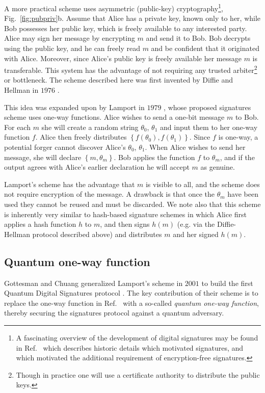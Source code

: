 A more practical scheme uses asymmetric (public-key) cryptography\footnote{A fascinating overview of the development of digital signatures may be found in Ref.~\cite{Simmons1988} which describes historic details which motivated signatures, and which motivated the additional requirement of encryption-free signatures.}, Fig.~\ref{fig:pubpriv}b. Assume that Alice has a private key, known only to her, while Bob possesses her public key, which is freely available to any interested party. Alice may sign her message by encrypting $m$ and send it to Bob. Bob decrypts using the public key, and he can freely read $m$ and be confident that it originated with Alice. Moreover, since Alice's public key is freely available her message $m$ is transferable. This system has the advantage of not requiring any trusted arbiter\footnote{Though in practice one will use a certificate authority to distribute the public keys.} or bottleneck. The scheme described here was first invented by Diffie and Hellman in $1976$ \cite{Diffie1976}.

This idea was expanded upon by Lamport in $1979$ \cite{Lamport1979}, whose proposed signatures scheme uses one-way functions. Alice wishes to send a one-bit message $m$ to Bob. For each $m$ she will create a random string $\theta_0$, $\theta_1$ and input them to her one-way function $f$. Alice then freely distributes $\left\{f\left(\theta_0\right), f\left(\theta_1\right)\right\}$. Since $f$ is one-way, a potential forger cannot discover Alice's $\theta_0$, $\theta_1$. When Alice wishes to send her message, she will declare $\left\{m, \theta_m\right\}$. Bob applies the function $f$ to $\theta_m$, and if the output agrees with Alice's earlier declaration he will accept $m$ as genuine. 

Lamport's scheme has the advantage that $m$ is visible to all, and the scheme does not require encryption of the message. A drawback is that once the $\theta_m$ have been used they cannot be reused and must be discarded. We note also that this scheme is inherently very similar to hash-based signature schemes in which Alice first applies a hash function $h$ \cite{Schneier1996} to $m$, and then signs $h\left(m\right)$ (e.g. via the Diffie-Hellman protocol described above) and distributes $m$ and her signed $h\left(m\right)$.



\subsection{Quantum one-way function}
Gottesman and Chuang generalized Lamport's scheme in $2001$ to build the first Quantum Digital Signatures protocol \cite{Gottesman2001}. The key contribution of their scheme is to replace the one-way function in Ref.~\cite{Lamport1979} with a so-called \emph{quantum one-way function}, thereby securing the signatures protocol against a quantum adversary.

